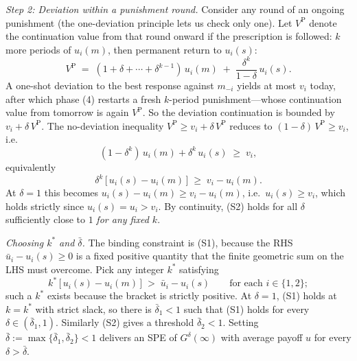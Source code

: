 \begin{thmpf}
  \smallskip
  \emph{Step 2: Deviation within a punishment round.} Consider any round of an ongoing punishment (the one-deviation principle lets us check only one). Let $V^{\text{P}}$ denote the continuation value from that round onward if the prescription is followed: $k$ more periods of $u_i(m)$, then permanent return to $u_i(s)$:
  \[
    V^{\text{P}} \;=\; (1+\delta+\cdots+\delta^{k-1})\,u_i(m) \;+\; \frac{\delta^k}{1-\delta}\,u_i(s).
  \]
  A one-shot deviation to the best response against $m_{-i}$ yields at most $v_i$ today, after which phase (4) restarts a fresh $k$-period punishment---whose continuation value from tomorrow is again $V^{\text{P}}$. So the deviation continuation is bounded by $v_i + \delta\,V^{\text{P}}$. The no-deviation inequality $V^{\text{P}} \ge v_i + \delta\,V^{\text{P}}$ reduces to $(1-\delta)\,V^{\text{P}} \ge v_i$, i.e.
  \[
    (1-\delta^k)\,u_i(m) + \delta^k\,u_i(s) \;\ge\; v_i,
  \]
  equivalently
  \[
    \delta^k\,\bigl[\,u_i(s) - u_i(m)\,\bigr] \;\ge\; v_i - u_i(m). \tag{S2}
  \]
  At $\delta = 1$ this becomes $u_i(s) - u_i(m) \ge v_i - u_i(m)$, i.e.\ $u_i(s) \ge v_i$, which holds strictly since $u_i(s) = u_i > v_i$. By continuity, (S2) holds for all $\delta$ sufficiently close to $1$ \emph{for any fixed $k$}.

  \smallskip
  \emph{Choosing $k^*$ and $\bar\delta$.} The binding constraint is (S1), because the RHS $\bar u_i - u_i(s) \ge 0$ is a fixed positive quantity that the finite geometric sum on the LHS must overcome. Pick any integer $k^*$ satisfying
  \[
    k^*\,\bigl[\,u_i(s) - u_i(m)\,\bigr] \;>\; \bar u_i - u_i(s) \qquad \text{for each } i \in \{1,2\};
  \]
  such a $k^*$ exists because the bracket is strictly positive. At $\delta = 1$, (S1) holds at $k = k^*$ with strict slack, so there is $\bar\delta_1 < 1$ such that (S1) holds for every $\delta \in (\bar\delta_1, 1)$. Similarly (S2) gives a threshold $\bar\delta_2 < 1$. Setting $\bar\delta := \max\{\bar\delta_1, \bar\delta_2\} < 1$ delivers an SPE of $G^\delta(\infty)$ with average payoff $u$ for every $\delta > \bar\delta$.
\end{thmpf}

